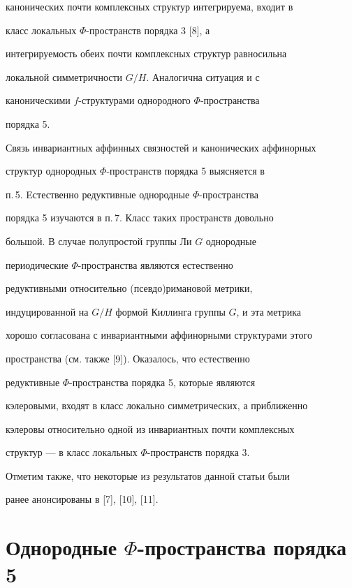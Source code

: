 канонических почти комплексных структур интегрируема, входит в


класс локальных $\Phi$-пространств порядка 3 [8], а


интегрируемость обеих почти комплексных структур равносильна


локальной симметричности $G/H$. Аналогична ситуация и с


каноническими $f$-структурами однородного $\Phi$-пространства


порядка 5.





Связь инвариантных аффинных связностей и канонических аффинорных


структур однородных $\Phi$-пространств порядка 5 выясняется в


п.\,5. Eстественно редуктивные однородные $\Phi$-пространства


порядка 5 изучаются в п.\,7. Класс таких пространств довольно


большой. В случае полупростой группы Ли $G$ однородные


периодические $\Phi$-пространства являются естественно


редуктивными относительно (псевдо)римановой метрики,


индуцированной на $G/H$ формой Киллинга группы $G$, и эта метрика


хорошо согласована с инвариантными аффинорными структурами этого


пространства (см. также [9]). Оказалось, что естественно


редуктивные $\Phi$-пространства порядка 5, которые являются


кэлеровыми, входят в класс локально симметрических, а приближенно


кэлеровы относительно одной из инвариантных почти комплексных


структур --- в класс локальных $\Phi$-пространств порядка 3.





Отметим также, что некоторые из результатов данной статьи были


ранее анонсированы в [7], [10], [11].





\section{Однородные $\Phi$-пространства порядка 5}





